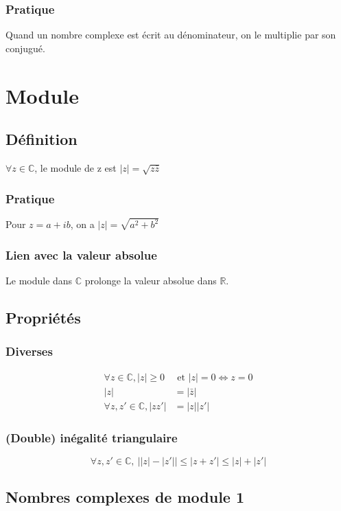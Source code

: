 \documentclass[12pt,a4paper,french]{book}
\begin{document}
			\subsubsection{Pratique}
				Quand un nombre complexe est écrit au dénominateur, on le multiplie par son conjugué.
	\section{Module}
		\subsection{Définition}
			$\forall z \in \mathbb{C}$, le module de z est $\left| z\right| = \sqrt{z \bar{z}}$
			\subsubsection{Pratique}
			Pour $z=a+ib$, on a $\left| z\right| = \sqrt{a^2 + b^2}$
			\subsubsection{Lien avec la valeur absolue}
			Le module dans $\mathbb{C}$ prolonge la valeur absolue dans $\mathbb{R}$.
		\subsection{Propriétés}
			\subsubsection{Diverses}
			\[\begin{split}
				\forall z \in \mathbb{C},\left| z\right| \geqslant 0 &\mbox{ et } \left| z\right| = 0 \Leftrightarrow z= 0 \\
				\left| z \right| &= \left| \bar{z} \right| \\
				\forall z,z' \in \mathbb{C},\left| zz' \right|& = \left| z \right| \left| z' \right| 
			\end{split} \]
			\subsubsection{(Double) inégalité triangulaire}
			\[\forall z,z' \in \mathbb{C},\ \left|\left|z\right|-\left|z'\right|\right|\leqslant\left|z+z'\right| \leqslant \left|z\right| + \left|z'\right|\]
		\subsection{Nombres complexes de module 1}
\end{document}

